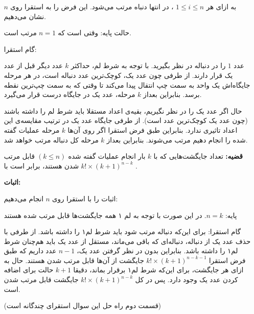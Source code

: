 \begin{PROBLEM}
{		\p
		به ازای هر 
		$1 \leq i \leq n$
		، در انتها دنباه مرتب می‌شود.
		این فرض را به استقرا روی 
		$n$
		نشان می‌دهیم.

		حالت پایه: وقتی است که 
		$n = 1$
		مرتب است.

		گام استقرا:

		عدد
		$1$
		را در دنباله در نظر بگیرید. با توجه به شرط لم، حداکثر
		$k$
		عدد دیگر قبل از عدد یک قرار دارند. از طرفی چون عدد یک، کوچک‌ترین عدد دنباله است،
		در هر مرحله جایگاه‌اش یک واحد به سمت چپ انتقال پیدا می‌کند تا وقتی که به سمت چپ‌ترین نقطه برسد. بنابراین بعداز
		$k$
		مرحله، عدد یک در جایگاه درست قرار می‌گیرد.

		حال اگر عدد یک را در نظر نگیریم، بقیه‌ی اعداد مستقلا باید شرط لم را داشته باشند (چون عدد یک کوچک‌ترین عدد است). از طرفی جایگاه عدد یک در ترتیب مقایسه‌ی این اعداد تاثیری ندارد.
		بنابراین طبق فرض استقرا اگر روی آن‌ها
		$k$
		مرحله عملیات گفته شده را انجام دهیم مرتب می‌شوند. بنابراین بعداز
		$k$
		مرحله کل دنباله مرتب خواهد شد.

		\textbf{قضیه: }
		تعداد جایگشت‌هایی که با 
		$k$
		بار انجام عملیات گفته شده
		$(k \leq n)$
		قابل مرتب شدن هستند، برابر است با 
		$k! \times (k+1)^{n-k}$
		.

		\textbf{اثبات:}

		اثبات را با استقرا روی 
		$n$
		انجام می‌دهیم:

		پایه:
		$n = k$.
		در این صورت با توجه به لم ۱ همه جایگشت‌ها قابل مرتب شده هستند

		گام استقرا: برای این‌که دنباله مرتب شود باید شرط لم۱ را داشته باشد. از طرفی با حذف عدد یک از دنباله، دنباله‌ای که باقی می‌ماند، مستقل از عدد یک باید هم‌چنان شرط لم۱ را داشته باشد. بنابراین بدون در نظر گرفتن عدد یک،
		$n - 1$
		عدد داریم که طبق فرض استقرا
		$k! \times (k+1)^{n-k-1}$
		جایگشت از آن‌ها قابل مرتب شدن هستند. حال به ازای هر جایگشت، برای این‌که شرط لم۱ برقرار بماند، دقیقا
		$k+1$
		حالت برای اضافه کردن عدد یک وجود دارد. پس در کل
		$k! \times (k+1)^{n-k}$
		جایگشت قابل مرتب شدن است.

		(قسمت دوم راه حل این سوال استقرای چندگانه است)
	}
\end{PROBLEM}